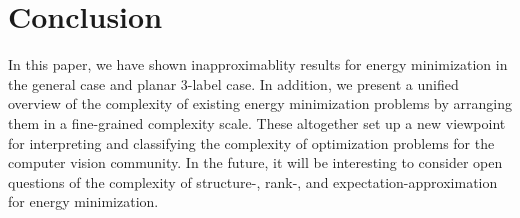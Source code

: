 \section{Conclusion}

In this paper, we have shown inapproximablity results for energy minimization in the general case and planar 3-label case. In addition, we present a unified overview of the complexity of existing energy minimization problems by arranging them in a fine-grained complexity scale. These altogether set up a new viewpoint for interpreting and classifying the complexity of optimization problems for the computer vision community.  In the future, it will be interesting to consider open questions of the complexity of structure-, rank-, and expectation-approximation for energy minimization.

